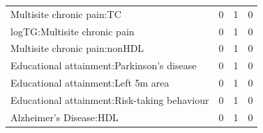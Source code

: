 \begin{table}[ht]
\begin{tabular}{lrrr}
  Multisite chronic pain:TC &   0 &   1 &   0 \\ 
  logTG:Multisite chronic pain &   0 &   1 &   0 \\ 
  Multisite chronic pain:nonHDL &   0 &   1 &   0 \\ 
  Educational attainment:Parkinson's disease &   0 &   1 &   0 \\ 
  Educational attainment:Left 5m area &   0 &   1 &   0 \\ 
  Educational attainment:Risk-taking behaviour &   0 &   1 &   0 \\ 
  Alzheimer's Disease:HDL &   0 &   1 &   0 \\ 
   \hline
\end{tabular}
\end{table}


